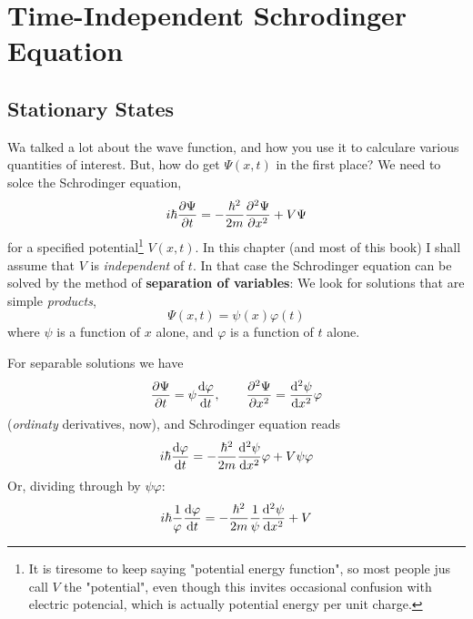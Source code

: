 \chapter{Time-Independent Schrodinger Equation}
\section{Stationary States}\label{sec:A-3}
Wa talked a lot about the wave function, and how you use it to calculare various quantities of interest. But, how do get $\Psi(x,t)$ in the first place? We need to solce the Schrodinger equation,
\begin{equation}\label{2.1}
	i\hbar\pdv{\Psi}{t}=-\frac{\hbar^2}{2m}\pdv[2]{\Psi}{x}+V\Psi
\end{equation}
for a specified potential\footnote{It is tiresome to keep saying "potential energy function", so most people jus call $V$ the "potential", even though this invites occasional confusion with electric potencial, which is actually potential energy per unit charge.} $V(x,t)$. In this chapter (and most of this book) I shall assume that $V$ is \textit{independent} of $t$. In that case the Schrodinger equation can be solved by the method of \textbf{separation of variables}: We look for solutions that are simple \textit{products},
\begin{equation}\label{2.2}
	\Psi(x,t)=\psi(x)\varphi(t)
\end{equation}
where $\psi$ is a function of $x$ alone, and $\varphi$ is a function of $t$ alone. 

For separable solutions we have
\begin{equation*}
	\pdv{\Psi}{t}=\psi\dv{\varphi}{t},\qquad \pdv[2]{\Psi}{x}=\dv[2]{\psi}{x}\varphi
\end{equation*}
(\textit{ordinaty} derivatives, now), and Schrodinger equation reads
\begin{equation}
	i\hbar\dv{\varphi}{t}=-\frac{\hbar^2}{2m}\dv[2]{\psi}{x}\varphi + V\psi\varphi
\end{equation}
Or, dividing through by $\psi\varphi$:
\begin{equation}\label{2.3}
	i\hbar\frac{1}{\varphi}\dv{\varphi}{t}=-\frac{\hbar^2}{2m}\frac{1}{\psi}\dv[2]{\psi}{x}+V
\end{equation}

